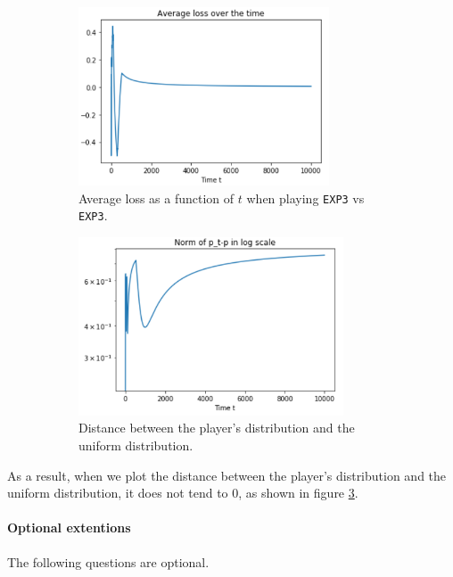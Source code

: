 \begin{enumerate}[resume]
\begin{solution}
    \begin{figure}[h!]
    \centering
    \begin{subfigure}{.47\textwidth}
      \centering
      \includegraphics[height=150pt]{image1/q7a_average_loss.png}
      \caption{Average loss as a function of $t$ when playing \lstinline{EXP3} vs \lstinline{EXP3}.}
      \label{fig:q7a}
    \end{subfigure}%
    \hspace{2mm}
    \begin{subfigure}{.47\textwidth}
      \centering
      \includegraphics[height=150pt]{image1/q7b_norm_pt.png}
      \caption{Distance between the player's distribution and the uniform distribution.}
      \label{fig:q7b}
    \end{subfigure}%
    \caption{}
    \end{figure}
    
    As a result, when we plot the distance between the player's distribution and the uniform distribution, it does not tend to $0$, as shown in figure \ref{fig:q7b}.

    \end{solution}
\end{enumerate}

\newpage
\paragraph{Optional extentions} The following questions are optional.

